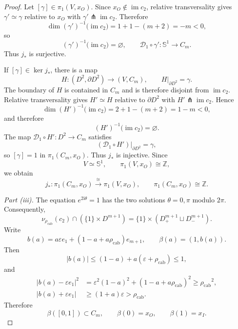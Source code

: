 \documentclass[10pt,a4paper]{amsart}
\newcommand{\rhoCab}{{\rho_{\mathrm{cab}}}}
\begin{document}
\begin{proof}
Let $[\gamma]\in\pi_1(V,x_O)$.  Since $x_O\notin\operatorname{im}c_2$,
relative transversality gives
$\gamma'\simeq\gamma$ relative to $x_O$ with
$\gamma'\pitchfork\operatorname{im}c_2$.  Therefore
\[
 \dim (\gamma')^{-1}\bigl(\operatorname{im}c_2\bigr)
 =1+1-(m+2)=-m<0,
\]
so
\[
 (\gamma')^{-1}\bigl(\operatorname{im}c_2\bigr)=\varnothing,
 \qquad
 \mathcal D_1\circ\gamma':\mathbb S^1\longrightarrow C_m.
\]
Thus $j_*$ is surjective.

If $[\gamma]\in\ker j_*$, there is a map
\[
 H:(D^2,\partial D^2)\longrightarrow(V,C_m),
 \qquad H|_{\partial D^2}=\gamma.
\]
The boundary of $H$ is contained in $C_m$ and is therefore disjoint from
$\operatorname{im}c_2$.  Relative transversality gives
$H'\simeq H$ relative to $\partial D^2$ with
$H'\pitchfork\operatorname{im}c_2$.  Hence
\[
 \dim (H')^{-1}\bigl(\operatorname{im}c_2\bigr)
 =2+1-(m+2)=1-m<0,
\]
and therefore
\[
 (H')^{-1}\bigl(\operatorname{im}c_2\bigr)=\varnothing.
\]
The map $\mathcal D_1\circ H':D^2\to C_m$ satisfies
\[
 (\mathcal D_1\circ H')|_{\partial D^2}=\gamma,
\]
so $[\gamma]=1$ in $\pi_1(C_m,x_O)$.  Thus $j_*$ is injective.
Since
\[
 V\simeq\mathbb S^1,
 \qquad
 \pi_1(V,x_O)\cong\mathbb Z,
\]
we obtain
\[
 j_*:\pi_1(C_m,x_O)\xrightarrow{\ \cong\ }\pi_1(V,x_O),
 \qquad
 \pi_1(C_m,x_O)\cong\mathbb Z.
\]

\emph{Part \textup{(iii)}.}
The equation $e^{2\mathrm i\theta}=1$ has the two solutions
$\theta=0,\pi$ modulo $2\pi$.  Consequently,
\[
 \nu_{\rhoCab}(c_2)\cap(\{1\}\times D^{m+1})
 =\{1\}\times(D^{m+1}_+\sqcup D^{m+1}_-).
\]
Write
\[
 b(a)=a\varepsilon e_1+(1-a+a\rhoCab)e_{m+1},
 \qquad \beta(a)=(1,b(a)).
\]
Then
\[
 |b(a)|\le(1-a)+a(\varepsilon+\rhoCab)\le1,
\]
and
\begin{align*}
 |b(a)-\varepsilon e_1|^2
 &=\varepsilon^2(1-a)^2+(1-a+a\rhoCab)^2
 \ge\rhoCab^2,\\
 |b(a)+\varepsilon e_1|
 &\ge(1+a)\varepsilon>\rhoCab.
\end{align*}
Therefore
\[
 \beta([0,1])\subset C_m,
 \qquad
 \beta(0)=x_O,
 \qquad
 \beta(1)=x_I.
\]


\end{proof}
\end{document}
